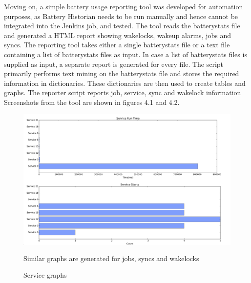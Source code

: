 Moving on, a simple battery usage reporting tool was developed for automation purposes, as Battery Historian needs to be run manually and hence cannot be integrated into the Jenkins job, and tested. The tool reads the batterystats file and generated a HTML report showing wakelocks, wakeup alarms, jobs and syncs. The reporting tool takes either a single batterystats file or a text file containing a list of batterystats files as input. In case a list of batterystats files is supplied as input, a separate report is generated for every file. The script primarily performs text mining on the batterystats file and stores the required information in dictionaries. These dictionaries are then used to create tables and graphs. The reporter script reports job, service, sync and wakelock information Screenshots from the tool are shown in figures 4.1 and 4.2.\\
\begin{figure}[!h]
 	\begin{center}
		\includegraphics[scale=0.35]{reporter2}
		\caption{Service graphs}
		Similar graphs are generated for jobs, syncs and wakelocks
	\end{center}
\end{figure}
